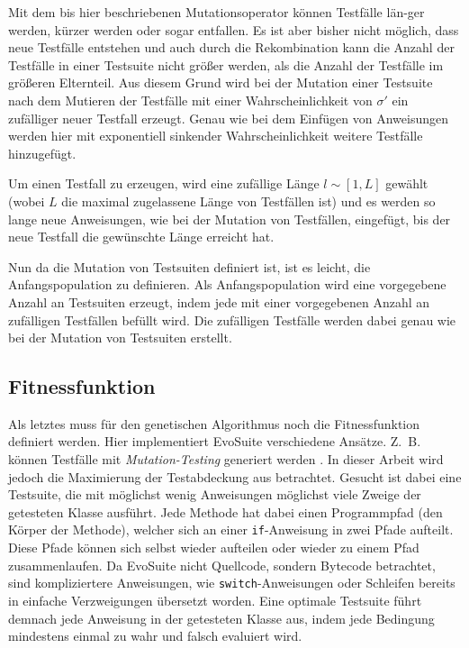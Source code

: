 \documentclass[a4paper,11pt]{article}
\begin{document}
Mit dem bis hier beschriebenen Mutationsoperator können Testfälle län-ger werden, kürzer werden oder sogar entfallen.
Es ist aber bisher nicht möglich, dass neue Testfälle entstehen und auch durch die Rekombination kann die Anzahl der Testfälle in einer Testsuite nicht größer werden, als die Anzahl der Testfälle im größeren Elternteil.
Aus diesem Grund wird bei der Mutation einer Testsuite nach dem Mutieren der Testfälle mit einer Wahrscheinlichkeit von $\sigma'$ ein zufälliger neuer Testfall erzeugt.
Genau wie bei dem Einfügen von Anweisungen werden hier mit exponentiell sinkender Wahrscheinlichkeit weitere Testfälle hinzugefügt.

Um einen Testfall zu erzeugen, wird eine zufällige Länge $l \sim [1, L]$ gewählt (wobei $L$ die maximal zugelassene Länge von Testfällen ist) und es werden so lange neue Anweisungen, wie bei der Mutation von Testfällen, eingefügt, bis der neue Testfall die gewünschte Länge erreicht hat.

Nun da die Mutation von Testsuiten definiert ist, ist es leicht, die Anfangspopulation zu definieren.
Als Anfangspopulation wird eine vorgegebene Anzahl an Testsuiten erzeugt, indem jede mit einer vorgegebenen Anzahl an zufälligen Testfällen befüllt wird.
Die zufälligen Testfälle werden dabei genau wie bei der Mutation von Testsuiten erstellt.

\subsection{Fitnessfunktion}

Als letztes muss für den genetischen Algorithmus noch die Fitnessfunktion definiert werden.
Hier implementiert EvoSuite verschiedene Ansätze.
Z.~B. können Testfälle mit \textit{Mutation-Testing} generiert werden \cite{emse14_mutation}.
In dieser Arbeit wird jedoch die Maximierung der Testabdeckung aus \cite{TSE12_EvoSuite} betrachtet.
Gesucht ist dabei eine Testsuite, die mit möglichst wenig Anweisungen möglichst viele Zweige der getesteten Klasse ausführt.
Jede Methode hat dabei einen Programmpfad (den Körper der Methode), welcher sich an einer \lstinline{if}-Anweisung in zwei Pfade aufteilt.
Diese Pfade können sich selbst wieder aufteilen oder wieder zu einem Pfad zusammenlaufen.
Da EvoSuite nicht Quellcode, sondern Bytecode betrachtet, sind kompliziertere Anweisungen, wie \lstinline{switch}-Anweisungen oder Schleifen bereits in einfache Verzweigungen übersetzt worden.
Eine optimale Testsuite führt demnach jede Anweisung in der getesteten Klasse aus, indem jede Bedingung mindestens einmal zu wahr und falsch evaluiert wird.
\end{document}
